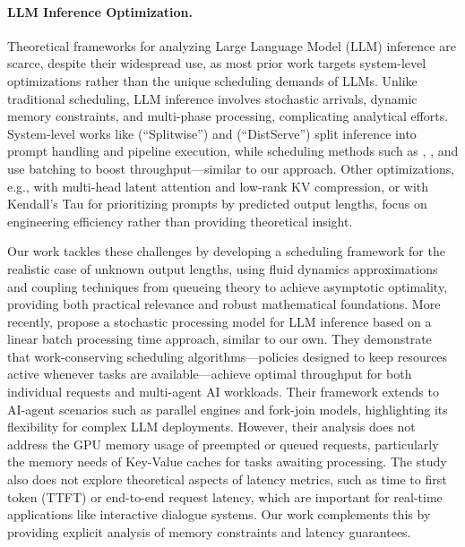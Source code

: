 \paragraph{LLM Inference Optimization.} 
Theoretical frameworks for analyzing Large Language Model (LLM) inference are scarce, despite their widespread use, as most prior work targets system-level optimizations rather than the unique scheduling demands of LLMs. Unlike traditional scheduling, LLM inference involves stochastic arrivals, dynamic memory constraints, and multi-phase processing, complicating analytical efforts. System-level works like \citet{patel2023peeling} (``Splitwise'') and \citet{zhong2024distserve} (``DistServe'') split inference into prompt handling and pipeline execution, while scheduling methods such as \citet{yu2022orca}, \citet{agrawal2023sarathi}, and \citet{agrawal2024taming} use batching to boost throughput---similar to our approach. Other optimizations, e.g., \citet{deepseekai2024deepseekv2strongeconomicalefficient} with multi-head latent attention and low-rank KV compression, or \citet{fu2025efficient} with Kendall's Tau for prioritizing prompts by predicted output lengths, focus on engineering efficiency rather than providing theoretical insight. 

Our work tackles these challenges by developing a scheduling framework for the realistic case of unknown output lengths, using fluid dynamics approximations and coupling techniques from queueing theory to achieve asymptotic optimality, providing both practical relevance and robust mathematical foundations. More recently, \citet{li2025throughput} propose a stochastic processing model for LLM inference based on a linear batch processing time approach, similar to our own. They demonstrate that work-conserving scheduling algorithms---policies designed to keep resources active whenever tasks are available---achieve optimal throughput for both individual requests and multi-agent AI workloads. Their framework extends to AI-agent scenarios such as parallel engines and fork-join models, highlighting its flexibility for complex LLM deployments. However, their analysis does not address the GPU memory usage of preempted or queued requests, particularly the memory needs of Key-Value caches for tasks awaiting processing. The study also does not explore theoretical aspects of latency metrics, such as time to first token (TTFT) or end-to-end request latency, which are important for real-time applications like interactive dialogue systems. Our work complements this by providing explicit analysis of memory constraints and latency guarantees.

